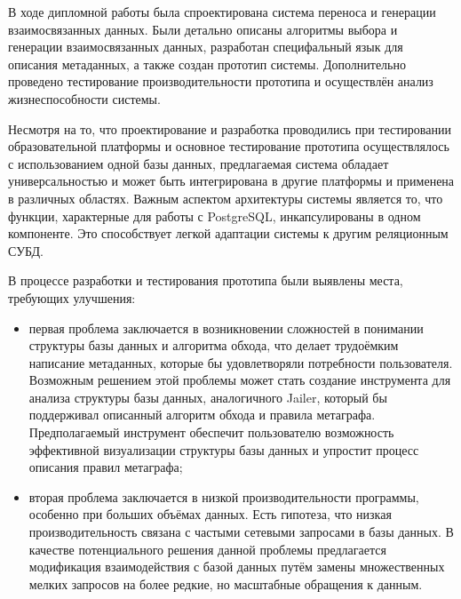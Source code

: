 \conclusion

В ходе дипломной работы была спроектирована система переноса и генерации взаимосвязанных данных. Были детально описаны алгоритмы выбора и генерации взаимосвязанных данных, разработан специфальный язык для описания метаданных, а также создан прототип системы. Дополнительно проведено тестирование производительности прототипа и осуществлён анализ жизнеспособности системы.

Несмотря на то, что проектирование и разработка проводились при тестировании образовательной платформы и основное тестирование прототипа осуществлялось с использованием одной базы данных, предлагаемая система обладает универсальностью и может быть интегрирована в другие платформы и применена в различных областях. Важным аспектом архитектуры системы является то, что функции, характерные для работы с PostgreSQL, инкапсулированы в одном компоненте. Это способствует легкой адаптации системы к другим реляционным СУБД.

В процессе разработки и тестирования прототипа были выявлены места, требующих улучшения:
\begin{itemize}
    \item первая проблема заключается в возникновении сложностей в понимании структуры базы данных и алгоритма обхода, что делает трудоёмким написание метаданных, которые бы удовлетворяли потребности пользователя. Возможным решением этой проблемы может стать создание инструмента для анализа структуры базы данных, аналогичного Jailer, который бы поддерживал описанный алгоритм обхода и правила метаграфа. Предполагаемый инструмент обеспечит пользователю возможность эффективной визуализации структуры базы данных и упростит процесс описания правил метаграфа;
    \item вторая проблема заключается в низкой производительности программы, особенно при больших объёмах данных. Есть гипотеза, что низкая производительность связана с частыми сетевыми запросами в базы данных. В качестве потенциального решения данной проблемы предлагается модификация взаимодействия с базой данных путём замены множественных мелких запросов на более редкие, но масштабные обращения к данным.
\end{itemize}
